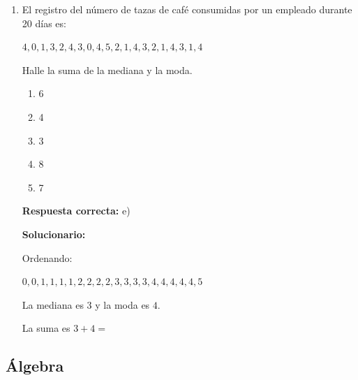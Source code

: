 \begin{enumerate}
	$256+8x=288$.
	
	$x=4$.
	
	$x^2-1=16-1=$
	
	\vspace{6mm}
	
	\item El registro del número de tazas de café consumidas por un empleado durante 20 días es:
	
	$4,0,1,3,2,4,3,0,4,5,2,1,4,3,2,1,4,3,1,4$
	
	Halle la suma de la mediana y la moda.
	\begin{enumerate}[label=\alph*)]
		\item 6
		\item 4
		\item 3
		\item 8
		\item 7
	\end{enumerate}
	\textbf{Respuesta correcta:} e)
	
	\vspace{2mm}
	\textbf{Solucionario:}
	
	Ordenando:
	
	$0,0,1,1,1,1,2,2,2,2,3,3,3,3,4,4,4,4,4,5$
	
	La mediana es $3$ y la moda es $4$.
	
	La suma es $3+4=$
	
	\vspace{6mm}
\end{enumerate}

\subsection*{Álgebra}

